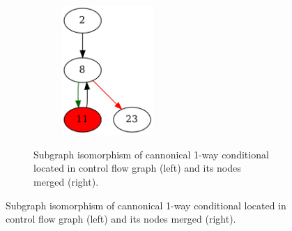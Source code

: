 \documentclass[aspectratio=1610]{beamer}
\begin{document}
\begin{frame}
\begin{figure}[htbp]
\begin{subfigure}[b]{0.65\textwidth}
\begin{subfigure}[ht]{0.40\textwidth}
			\end{subfigure}
			\quad
			\begin{subfigure}[ht]{0.40\textwidth}
				\centering
				\includegraphics[width=0.5\textwidth]{inc/methods/hammock/example/main_0002b.png}
			\end{subfigure}
			\caption{Subgraph isomorphism of cannonical 1-way conditional located in control flow graph (left) and its nodes merged (right).}
		\end{subfigure}
	\end{figure}
\end{frame}

\end{document}
